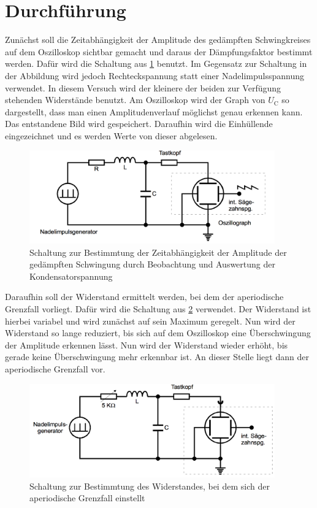 \section{Durchführung}
\label{sec:Durchführung}
Zunächst soll die Zeitabhängigkeit der Amplitude des gedämpften Schwingkreises auf
dem Oszilloskop sichtbar gemacht und daraus der Dämpfungsfaktor bestimmt werden.
Dafür wird die Schaltung aus \ref{fig:aufbau_1} benutzt. Im Gegensatz zur Schaltung in der Abbildung
wird jedoch Rechteckspannung statt einer Nadelimpulsspannung verwendet. In diesem
Versuch wird der kleinere der beiden zur Verfügung stehenden Widerstände benutzt.
Am Oszilloskop wird der Graph von $U_{\text{C}}$ so dargestellt,
dass man einen Amplitudenverlauf möglichst genau erkennen kann.
Das entstandene Bild wird gespeichert. Daraufhin wird die Einhüllende eingezeichnet
und es werden Werte von dieser abgelesen.
\begin{figure}
  \centering
  \includegraphics[width=300pt]{data/aufbau_1.png}
  \caption{Schaltung zur Bestimmtung der Zeitabhängigkeit der Amplitude der gedämpften
  Schwingung durch Beobachtung und Auswertung der Kondensatorspannung \cite{Versuchsanleitung1}}
  \label{fig:aufbau_1}
\end{figure}


Daraufhin soll der Widerstand ermittelt werden, bei dem der aperiodische Grenzfall
vorliegt. Dafür wird die Schaltung aus \ref{fig:aufbau_2} verwendet. Der Widerstand ist hierbei variabel
und wird zunächst auf sein Maximum geregelt. Nun wird der Widerstand so lange reduziert,
bis sich auf dem Oszilloskop eine Überschwingung der Amplitude erkennen lässt. Nun wird
der Widerstand wieder erhöht, bis gerade keine Überschwingung mehr erkennbar ist. An
dieser Stelle liegt dann der aperiodische Grenzfall vor.
\begin{figure}
  \centering
  \includegraphics[width=300pt]{data/aufbau_2.png}
  \caption{Schaltung zur Bestimmtung des Widerstandes, bei dem sich der aperiodische
  Grenzfall einstellt \cite{Versuchsanleitung1}}
  \label{fig:aufbau_2}
\end{figure}


